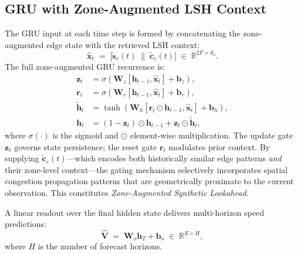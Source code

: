 \documentclass[journal,letterpaper,10pt]{IEEEtran}
\theoremstyle{definition}
\theoremstyle{remark}
\newcommand{\R}{\mathbb{R}}
\begin{document}
\subsection{GRU with Zone-Augmented LSH Context}
\label{sec:gru}

The GRU input at each time step is formed by concatenating the
zone-augmented edge state with the retrieved LSH context:
\begin{equation}
  \hat{\mathbf{x}}_{t}
  \;=\;
  \bigl[\tilde{\mathbf{s}}_{e}(t)
  \;\|\;
  \tilde{\mathbf{c}}_{e}(t)\bigr]
  \;\in\;\R^{2F+d_o}.
  \label{eq:gru_input}
\end{equation}
The full zone-augmented GRU recurrence is:
\begin{align}
  \mathbf{z}_{t}
    &= \sigma\!\left(\mathbf{W}_{z}
       [\mathbf{h}_{t-1},\hat{\mathbf{x}}_{t}]
       +\mathbf{b}_{z}\right),
  \label{eq:update_gate}\\[3pt]
  \mathbf{r}_{t}
    &= \sigma\!\left(\mathbf{W}_{r}
       [\mathbf{h}_{t-1},\hat{\mathbf{x}}_{t}]
       +\mathbf{b}_{r}\right),
  \label{eq:reset_gate}\\[3pt]
  \tilde{\mathbf{h}}_{t}
    &= \tanh\!\left(\mathbf{W}_{h}
       [\mathbf{r}_{t}\odot\mathbf{h}_{t-1},\hat{\mathbf{x}}_{t}]
       +\mathbf{b}_{h}\right),
  \label{eq:candidate}\\[3pt]
  \mathbf{h}_{t}
    &= \left(1-\mathbf{z}_{t}\right)\odot\mathbf{h}_{t-1}
       +\mathbf{z}_{t}\odot\tilde{\mathbf{h}}_{t},
  \label{eq:hidden}
\end{align}
where $\sigma(\cdot)$ is the sigmoid and $\odot$ element-wise
multiplication.  The update gate $\mathbf{z}_t$ governs state
persistence; the reset gate $\mathbf{r}_t$ modulates prior context.
By supplying $\tilde{\mathbf{c}}_{e}(t)$---which encodes both
historically similar edge patterns \emph{and} their zone-level
context---the gating mechanism selectively incorporates spatial
congestion propagation patterns that are geometrically proximate to
the current observation.  This constitutes \emph{Zone-Augmented
Synthetic Lookahead}.

A linear readout over the final hidden state delivers multi-horizon
speed predictions:
\begin{equation}
  \hat{\mathbf{V}}
  \;=\;
  \mathbf{W}_{o}\mathbf{h}_{T}+\mathbf{b}_{o}
  \;\in\;\R^{E\times H},
  \label{eq:readout}
\end{equation}
where $H$ is the number of forecast horizons.
\end{document}
